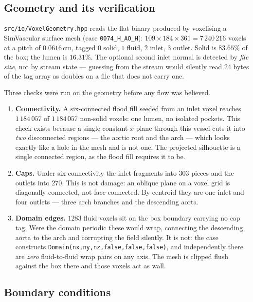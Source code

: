 \documentclass[11pt,a4paper]{article}
\newcommand{\code}[1]{\texttt{\small #1}}
\begin{document}
\subsection{Geometry and its verification}
\label{sec:aortageom}

\code{src/io/VoxelGeometry.hpp} reads the flat binary produced by voxelising a
SimVascular surface mesh (case \code{0074\_H\_AO\_H}): $109\times184\times361 =
7\,240\,216$ voxels at a pitch of $0.0616$\,cm, tagged $0$ solid, $1$ fluid,
$2$ inlet, $3$ outlet. Solid is $83.65\%$ of the box; the lumen is $16.31\%$.
The optional second inlet normal is detected by \emph{file size}, not by stream
state --- guessing from the stream would silently read 24 bytes of the tag array
as doubles on a file that does not carry one.

Three checks were run on the geometry before any flow was believed.

\begin{enumerate}[leftmargin=1.4em,itemsep=3pt]
\item \textbf{Connectivity.} A six-connected flood fill seeded from an inlet
  voxel reaches $1\,184\,057$ of $1\,184\,057$ non-solid voxels: one lumen, no
  isolated pockets. This check exists because a single constant-$x$ plane
  through this vessel cuts it into \emph{two} disconnected regions --- the aortic
  root and the arch --- which looks exactly like a hole in the mesh and is not
  one. The projected silhouette is a single connected region, as the flood fill
  requires it to be.

\item \textbf{Caps.} Under six-connectivity the inlet fragments into $303$ pieces
  and the outlets into $270$. This is not damage: an oblique plane on a voxel
  grid is diagonally connected, not face-connected. By centroid they are one
  inlet and four outlets --- three arch branches and the descending aorta.

\item \textbf{Domain edges.} $1283$ fluid voxels sit on the box boundary carrying
  no cap tag. Were the domain periodic these would wrap, connecting the
  descending aorta to the arch and corrupting the field silently. It is not:
  the case constructs \code{Domain(nx,ny,nz,false,false,false)}, and
  independently there are \emph{zero} fluid-to-fluid wrap pairs on any axis. The
  mesh is clipped flush against the box there and those voxels act as wall.
\end{enumerate}

\subsection{Boundary conditions}
\label{sec:aortabc}
\end{document}
